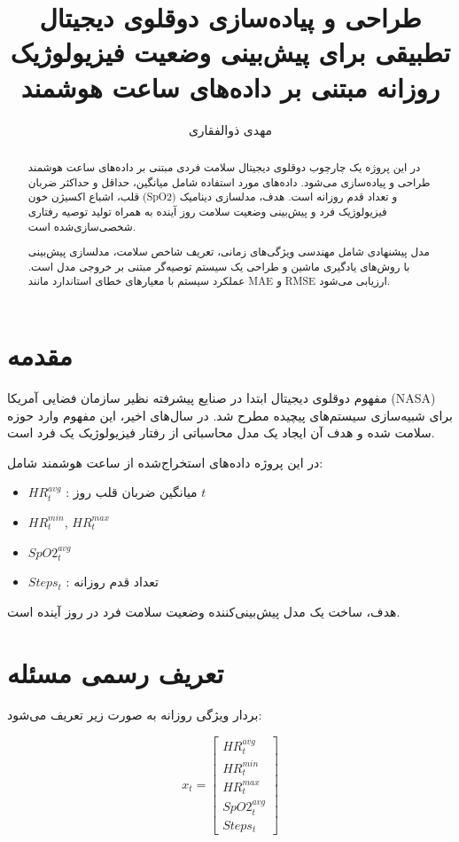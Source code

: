 \documentclass[12pt,a4paper]{article}
\title{طراحی و پیاده‌سازی دوقلوی دیجیتال تطبیقی برای پیش‌بینی وضعیت فیزیولوژیک روزانه مبتنی بر داده‌های ساعت هوشمند}
\author{مهدی ذوالفقاری}
\date{}
\begin{document}
	
	\maketitle
	
	\begin{abstract}
		در این پروژه یک چارچوب دوقلوی دیجیتال سلامت فردی مبتنی بر داده‌های ساعت هوشمند طراحی و پیاده‌سازی می‌شود. داده‌های مورد استفاده شامل میانگین، حداقل و حداکثر ضربان قلب، اشباع اکسیژن خون (SpO2) و تعداد قدم روزانه است. هدف، مدلسازی دینامیک فیزیولوژیک فرد و پیش‌بینی وضعیت سلامت روز آینده به همراه تولید توصیه رفتاری شخصی‌سازی‌شده است. 
		
		مدل پیشنهادی شامل مهندسی ویژگی‌های زمانی، تعریف شاخص سلامت، مدلسازی پیش‌بینی با روش‌های یادگیری ماشین و طراحی یک سیستم توصیه‌گر مبتنی بر خروجی مدل است. عملکرد سیستم با معیارهای خطای استاندارد مانند MAE و RMSE ارزیابی می‌شود.
	\end{abstract}
	
	\section{مقدمه}
	
	مفهوم دوقلوی دیجیتال ابتدا در صنایع پیشرفته نظیر سازمان فضایی آمریکا (NASA) برای شبیه‌سازی سیستم‌های پیچیده مطرح شد. در سال‌های اخیر، این مفهوم وارد حوزه سلامت شده و هدف آن ایجاد یک مدل محاسباتی از رفتار فیزیولوژیک یک فرد است.
	
	در این پروژه داده‌های استخراج‌شده از ساعت هوشمند شامل:
	
	\begin{itemize}
		\item $HR^{avg}_t$ : میانگین ضربان قلب روز $t$
		\item $HR^{min}_t$, $HR^{max}_t$
		\item $SpO2^{avg}_t$
		\item $Steps_t$ : تعداد قدم روزانه
	\end{itemize}
	
	هدف، ساخت یک مدل پیش‌بینی‌کننده وضعیت سلامت فرد در روز آینده است.
	
	\section{تعریف رسمی مسئله}
	
	بردار ویژگی روزانه به صورت زیر تعریف می‌شود:
	
	\[
	x_t = 
	\begin{bmatrix}
		HR^{avg}_t \\
		HR^{min}_t \\
		HR^{max}_t \\
		SpO2^{avg}_t \\
		Steps_t
	\end{bmatrix}
	\]
	
\end{document}
